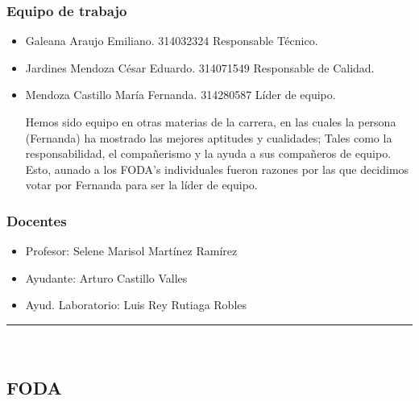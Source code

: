 \documentclass{article}
\begin{document}
\subsubsection*{Equipo de trabajo}
\begin{itemize}
\item Galeana Araujo Emiliano. 314032324 Responsable Técnico.
\item Jardines Mendoza César Eduardo. 314071549 Responsable de Calidad.
\item Mendoza Castillo María Fernanda. 314280587 Líder de equipo.
  
    Hemos sido equipo en otras materias de la carrera, en las cuales la persona
  (Fernanda) ha mostrado las mejores aptitudes y cualidades; Tales como la
  responsabilidad, el compañerismo y la ayuda a sus compañeros de equipo. Esto,
  aunado a los FODA's individuales fueron razones por las que decidimos votar por
  Fernanda para ser la líder de equipo.
\end{itemize}

\subsubsection*{Docentes}
\begin{itemize}
\item Profesor: Selene Marisol Martínez Ramírez
\item Ayudante: Arturo Castillo Valles
\item Ayud. Laboratorio: Luis Rey Rutiaga Robles
\end{itemize}

\rule{0.8\textwidth}{.8pt}\\

\subsection*{FODA}
\end{document}
